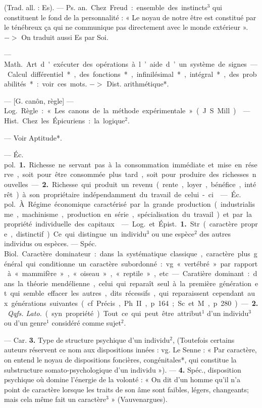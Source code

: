 
	\begin{itemize}[leftmargin=1cm, label=, itemsep=11pt]

 (Trad. all. : Es). — \si{Ps. an.} Chez
Freud : ensemble des instincts$^3$ qui
constituent le fond de la personnalité :
« Le noyau de notre être est constitué
par le ténébreux ça qui ne communique pas directement avec le
monde extérieur ». $->$ On traduit
aussi Es par Soi.

 — \si{Math.} Art d'exécuter des
opérations à l’aide d’un système de
signes. — Calcul différentiel*, des
fonctions*, infinilésimal*, intégral*,
des probabilités* : voir ces mots.
$->$ Dist. arithmétique*.

 — [G. canôn, règle] — \si{Log.}
Règle : « Les canons de la méthode
expérimentale » (J. S. Mill).

 — \si{Hist.} Chez les Épicuriens : la logique$^2$.

 — Voir Aptitude*.

 — \si{Éc. pol.} {\bf 1.} Richesse ne
servant pas à la consommation
immédiate et mise en réserve, soit
pour être consommée plus tard, soit
pour produire des richesses nouvelles. —  {\bf 2.} Richesse qui produit un
revenu (rente, loyer, bénéfice, intérêt) à son propriétaire indépendamment du travail de celui-ci.

 — \si{Éc. pol.} À Régime économique caractérisé par la grande
production (industrialisme, machinisme, production en série, spécialisation
du travail) et par la propriété individuelle des capitaux.

 — \si{Log.} et \si{Épist.} {\bf 1.} Str.
(caractère propre, distinctif). Ce qui
distingue un individu$^3$ ou une espèce$^2$
des autres individus ou espèces. —
Spéc. \si{Biol.} Caractère dominateur :
dans la systématique classique,
caractère plus général qui conditionne un caractère subordonné : vg.
« vertébré » par rapport à « mammifère », « oiseau », « reptile », etc. —
Caratière dominant : dans la théorie
mendélienne, celui qui reparaît seul
à la première génération et qui
semble effacer les autres, dits récessifs, qui reparaissent cependant aux
générations suivantes (cf. Précis,
Ph. II, p. 164; Sc. et M., p. 280). —
 {\bf 2.} {\it Qqfs. Lato.} (syn. propriété). Tout
ce qui peut être attribut$^1$ d’un individu$^3$ ou d’un genre$^1$ considéré
comme sujet$^2$.

— Car.  {\bf 3.} Type de structure psychique d’un individu$^2$, (Toutefois
certains auteurs réservent ce nom
aux dispositions innées : vg. Le
Senne : « Par caractère, on entend
le noyau de dispositions foncières,
congénitales*, qui constitue la substructure somato-psychologique d’un
individu »). —  {\bf 4.} Spéc., disposition
psychique où domine l'énergie de
la volonté : « On dit d’un homme
qu’il n’a point de caractère lorsque
les traits de son âme sont faibles,
légers, changeants; mais cela même
fait un caractère$^3$ » (Vauvenargues).


\end{itemize}
